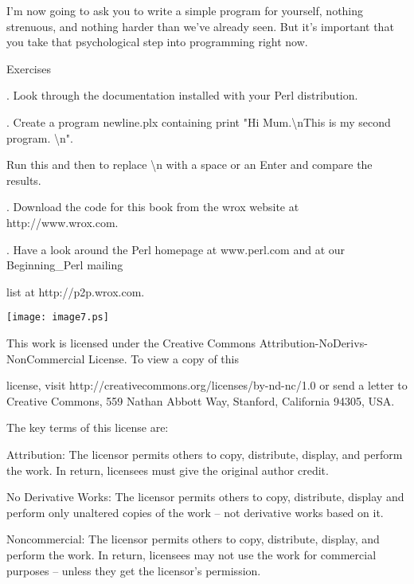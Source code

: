 \documentclass[a4paper,11pt]{book}
\begin{document}
\noindent 

\noindent I'm now  going to  ask you  to  write  a  simple  program  for  yourself,  nothing  strenuous,  and nothing harder than we've already  seen.  But  it's  important  that  you  take  that  psychological  step  into programming right now.

\noindent 

\noindent 

\noindent Exercises

\noindent 

.   Look through the documentation installed with your Perl distribution.

\noindent 

.   Create a program newline.plx containing print "Hi Mum.\textbackslash nThis is my second program. \textbackslash n".

\noindent Run this and then to replace \textbackslash n with a space or an Enter and compare the results.

\noindent 

.   Download the code for this book from the wrox website at http://www.wrox.com.

\noindent 

.   Have a look around the Perl homepage at www.perl.com and at our Beginning\_Perl mailing

\noindent list at http://p2p.wrox.com.

\noindent  

\noindent  

\noindent  

\noindent  

\noindent 

\noindent \texttt{[image: image7.ps]}

\noindent 

\noindent This work is licensed under the Creative Commons Attribution-NoDerivs-NonCommercial License. To view a copy of this

\noindent license, visit http://creativecommons.org/licenses/by-nd-nc/1.0 or send a letter to Creative Commons, 559 Nathan Abbott Way, Stanford, California 94305, USA.

\noindent 

\noindent The key terms of this license are:

\noindent 

\noindent Attribution: The licensor permits others to copy, distribute, display, and perform the work. In return, licensees must give the original author credit.

\noindent 

\noindent No  Derivative  Works: The licensor permits others to copy, distribute, display and perform only unaltered copies of the work -- not derivative works based on it.

\noindent 

\noindent Noncommercial: The licensor permits others to copy, distribute, display, and perform the work. In return, licensees may not use the work for commercial purposes -- unless they get the licensor's permission.
\end{document}
